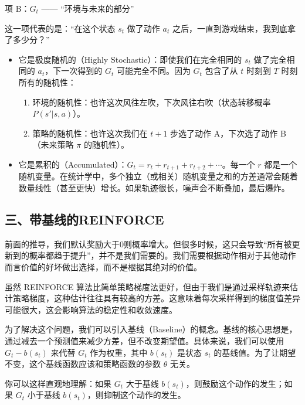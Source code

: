 项 B：\(G_t\) ------ ``环境与未来的部分''

这一项代表的是：``在这个状态 \(s_t\) 做了动作 \(a_t\) 之后，一直到游戏结束，我到底拿了多少分？''

\begin{itemize}
\tightlist
\item
  它是极度随机的（Highly Stochastic）：即使我们在完全相同的 \(s_t\) 做了完全相同的 \(a_t\)，下一次得到的 \(G_t\) 可能完全不同。因为 \(G_t\) 包含了从 \(t\) 时刻到 \(T\) 时刻所有的随机性：

  \begin{enumerate}
  \def\labelenumi{\arabic{enumi}.}
  \tightlist
  \item
    环境的随机性：也许这次风往左吹，下次风往右吹（状态转移概率 \(P(s'|s,a)\)）。
  \item
    策略的随机性：也许这次我们在 \(t+1\) 步选了动作 A，下次选了动作 B（未来策略 \(\pi\) 的随机性）。
  \end{enumerate}
\item
  它是累积的（Accumulated）：\(G_t=r_t+r_{t+1}+r_{t+2}+\cdots\)。每一个 \(r\) 都是一个随机变量。在统计学中，多个独立（或相关）随机变量之和的方差通常会随着数量线性（甚至更快）增长。如果轨迹很长，噪声会不断叠加，最后爆炸。
\end{itemize}

\hypertarget{ux4e09ux5e26ux57faux7ebfux7684reinforce}{%
\subsection{三、带基线的REINFORCE}\label{ux4e09ux5e26ux57faux7ebfux7684reinforce}}

前面的推导，我们默认奖励大于0则概率增大。但很多时候，这只会导致``所有被更新到的概率都趋于提升''，并不是我们需要的。我们需要根据动作相对于其他动作而言价值的好坏做出选择，而不是根据其绝对的价值。

虽然 REINFORCE 算法比简单策略梯度法更好，但由于我们是通过采样轨迹来估计策略梯度，这种估计往往具有较高的方差。这意味着每次采样得到的梯度值差异可能很大，这会影响算法的稳定性和收敛速度。

为了解决这个问题，我们可以引入基线（Baseline）的概念。基线的核心思想是，通过减去一个预测值来减少方差，但不改变期望值。具体来说，我们可以使用 \(G_t-b(s_t)\) 来代替 \(G_t\) 作为权重，其中 \(b(s_t)\) 是状态 \(s_t\) 的基线值。为了让期望不变，这个基线函数应该和策略函数的参数 \(\theta\) 无关。

你可以这样直观地理解：如果 \(G_t\) 大于基线 \(b(s_t)\)，则鼓励这个动作的发生；如果 \(G_t\) 小于基线 \(b(s_t)\)，则抑制这个动作的发生。

